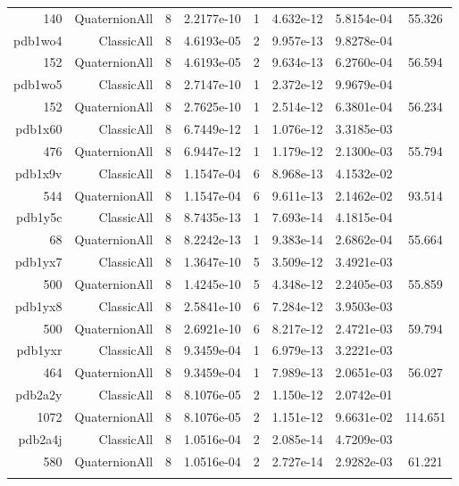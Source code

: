 \begin{xltabular}{\textwidth}{r|rcS[table-format=1.4e+2]cS[table-format=1.3e+2]S[table-format=1.4e+2]S[table-format=-1.3]}
140 & QuaternionAll & 8 & 2.2177e-10 & 1 & 4.632e-12 & 5.8154e-04 & 55.326\\  \addlinespace
pdb1wo4 & ClassicAll & 8 & 4.6193e-05 & 2 & 9.957e-13 & 9.8278e-04 & \\
152 & QuaternionAll & 8 & 4.6193e-05 & 2 & 9.634e-13 & 6.2760e-04 & 56.594\\  \addlinespace
pdb1wo5 & ClassicAll & 8 & 2.7147e-10 & 1 & 2.372e-12 & 9.9679e-04 & \\
152 & QuaternionAll & 8 & 2.7625e-10 & 1 & 2.514e-12 & 6.3801e-04 & 56.234\\  \addlinespace
pdb1x60 & ClassicAll & 8 & 6.7449e-12 & 1 & 1.076e-12 & 3.3185e-03 & \\
476 & QuaternionAll & 8 & 6.9447e-12 & 1 & 1.179e-12 & 2.1300e-03 & 55.794\\  \addlinespace
pdb1x9v & ClassicAll & 8 & 1.1547e-04 & 6 & 8.968e-13 & 4.1532e-02 & \\
544 & QuaternionAll & 8 & 1.1547e-04 & 6 & 9.611e-13 & 2.1462e-02 & 93.514\\  \addlinespace
pdb1y5c & ClassicAll & 8 & 8.7435e-13 & 1 & 7.693e-14 & 4.1815e-04 & \\
68 & QuaternionAll & 8 & 8.2242e-13 & 1 & 9.383e-14 & 2.6862e-04 & 55.664\\  \addlinespace
pdb1yx7 & ClassicAll & 8 & 1.3647e-10 & 5 & 3.509e-12 & 3.4921e-03 & \\
500 & QuaternionAll & 8 & 1.4245e-10 & 5 & 4.348e-12 & 2.2405e-03 & 55.859\\  \addlinespace
pdb1yx8 & ClassicAll & 8 & 2.5841e-10 & 6 & 7.284e-12 & 3.9503e-03 & \\
500 & QuaternionAll & 8 & 2.6921e-10 & 6 & 8.217e-12 & 2.4721e-03 & 59.794\\  \addlinespace
pdb1yxr & ClassicAll & 8 & 9.3459e-04 & 1 & 6.979e-13 & 3.2221e-03 & \\
464 & QuaternionAll & 8 & 9.3459e-04 & 1 & 7.989e-13 & 2.0651e-03 & 56.027\\  \addlinespace
pdb2a2y & ClassicAll & 8 & 8.1076e-05 & 2 & 1.150e-12 & 2.0742e-01 & \\
1072 & QuaternionAll & 8 & 8.1076e-05 & 2 & 1.151e-12 & 9.6631e-02 & 114.651\\  \addlinespace
pdb2a4j & ClassicAll & 8 & 1.0516e-04 & 2 & 2.085e-14 & 4.7209e-03 & \\
580 & QuaternionAll & 8 & 1.0516e-04 & 2 & 2.727e-14 & 2.9282e-03 & 61.221\\  \addlinespace

\end{xltabular}
